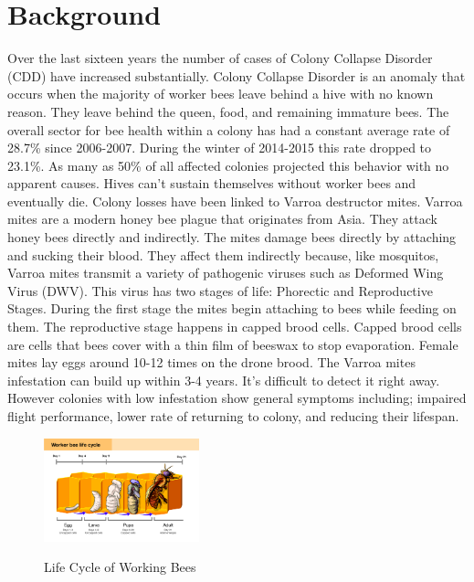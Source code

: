 \documentclass[final,5p,times,twocolumn,authoryear]{elsarticle}
\begin{document}
\section{Background}
\label{Background}

	Over the last sixteen years the number of cases of Colony Collapse Disorder (CDD) have increased substantially. Colony Collapse Disorder is an anomaly that occurs when the majority of worker bees leave behind a hive with no known reason. They leave behind the queen, food, and remaining immature bees. The overall sector for bee health within a colony has had a constant average rate of 28.7\% since 2006-2007. During the winter of 2014-2015 this rate dropped to 23.1\%. As many as 50\% of all affected colonies projected this behavior with no apparent causes. Hives can’t sustain themselves without worker bees and eventually die.  
        Colony losses have been linked to Varroa destructor mites. Varroa mites are a modern honey bee plague that originates from Asia. They attack honey bees directly and indirectly. The mites damage bees directly by attaching and sucking their blood. They affect them indirectly because, like mosquitos, Varroa mites transmit a variety of pathogenic viruses such as Deformed Wing Virus (DWV). This virus has two stages of life: Phorectic and Reproductive Stages. During the first stage the mites begin attaching to bees while feeding on them. The reproductive stage happens in capped brood cells. Capped brood cells are cells that bees cover with a thin film of beeswax to stop evaporation. Female mites lay eggs around 10-12 times on the drone brood. The Varroa mites infestation can build up within 3-4 years. It’s difficult to detect it right away. However colonies with low infestation show general symptoms including; impaired flight performance, lower rate of returning to colony, and reducing their lifespan.

\begin{figure}
  \centering
  \includegraphics[width=0.4\textwidth, angle=360f]{beecycle.jpg}
  
  Life Cycle of Working Bees
\end{figure}
        
\end{document}
